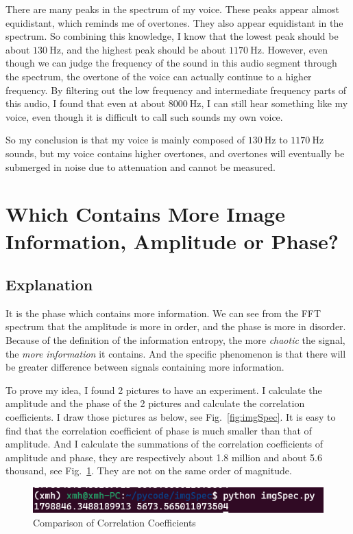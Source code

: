 \documentclass{article}
\begin{document}
There are many peaks in the spectrum of my voice. These peaks appear almost equidistant, which reminds me of overtones. They also appear equidistant in the spectrum. So combining this knowledge, I know that the lowest peak should be about $130~\mathrm{Hz}$, and the highest peak should be about $1170~\mathrm{Hz}$. However, even though we can judge the frequency of the sound in this audio segment through the spectrum, the overtone of the voice can actually continue to a higher frequency. By filtering out the low frequency and intermediate frequency parts of this audio, I found that even at about $8000~\mathrm{Hz}$, I can still hear something like my voice, even though it is difficult to call such sounds my own voice.

So my conclusion is that my voice is mainly composed of $130~\mathrm{Hz}$ to $1170~\mathrm{Hz}$ sounds, but my voice contains higher overtones, and overtones will eventually be submerged in noise due to attenuation and cannot be measured.

\section{Which Contains More Image Information, Amplitude or Phase?}
\subsection{Explanation}
It is the phase which contains more information. We can see from the FFT spectrum that the amplitude is more in order, and the phase is more in disorder. Because of the definition of the information entropy, the more \emph{chaotic} the signal, the \emph{more information} it contains. And the specific phenomenon is that there will be greater difference between signals containing more information.



To prove my idea, I found 2 pictures to have an experiment. I calculate the amplitude and the phase of the 2 pictures and calculate the correlation coefficients. I draw those pictures as below, see Fig.~\ref{fig:imgSpec}. It is easy to find that the correlation coefficient of phase is much smaller than that of amplitude. And I calculate the summations of the correlation coefficients of amplitude and phase, they are respectively about 1.8 million and about 5.6 thousand, see Fig.~\ref{fig:corrcoef}. They are not on the same order of magnitude.

\begin{figure}[!h]
	\centering
	\includegraphics[width=3 in]{../pic/corrcoef.png}
	\caption{Comparison of Correlation Coefficients}
	\label{fig:corrcoef}
\end{figure}
\end{document}
